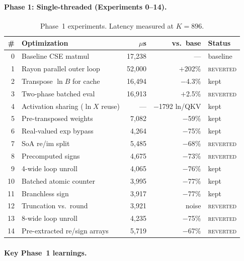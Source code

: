 \documentclass[acmsmall,nonacm]{acmart}
\begin{document}
\paragraph{Phase 1: Single-threaded (Experiments 0--14).}

\begin{table}[h]
\caption{Phase~1 experiments.  Latency measured at $K{=}896$.}
\label{tab:phase1}
\centering
\small
\begin{tabular}{rlrrl}
\toprule
\textbf{\#} & \textbf{Optimization} & \textbf{$\mu$s} & \textbf{vs.\ base} & \textbf{Status} \\
\midrule
0  & Baseline CSE matmul         & 17,238 & ---       & baseline \\
1  & Rayon parallel outer loop   & 52,000 & $+$202\%  & \textsc{reverted} \\
2  & Transpose $\ln B$ for cache & 16,494 & $-$4.3\%  & kept \\
3  & Two-phase batched eval      & 16,913 & $+$2.5\%  & \textsc{reverted} \\
4  & Activation sharing ($\ln X$ reuse) & ---  & $-$1792 ln/QKV & kept \\
5  & Pre-transposed weights      &  7,082 & $-$59\%   & kept \\
6  & Real-valued exp bypass      &  4,264 & $-$75\%   & kept \\
7  & SoA re/im split             &  5,485 & $-$68\%   & \textsc{reverted} \\
8  & Precomputed signs           &  4,675 & $-$73\%   & \textsc{reverted} \\
9  & 4-wide loop unroll          &  4,065 & $-$76\%   & kept \\
10 & Batched atomic counter      &  3,995 & $-$77\%   & kept \\
11 & Branchless sign             &  3,917 & $-$77\%   & kept \\
12 & Truncation vs.\ round       &  3,921 & noise     & \textsc{reverted} \\
13 & 8-wide loop unroll          &  4,235 & $-$75\%   & \textsc{reverted} \\
14 & Pre-extracted re/sign arrays&  5,719 & $-$67\%   & \textsc{reverted} \\
\bottomrule
\end{tabular}
\end{table}

\paragraph{Key Phase~1 learnings.}
\end{document}
